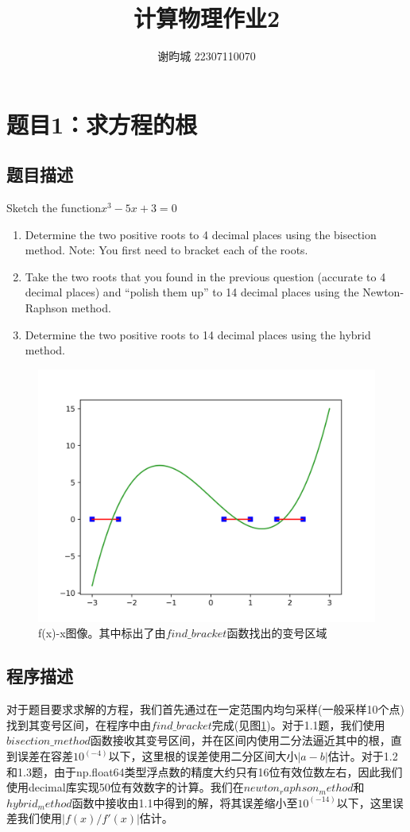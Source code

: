 \documentclass[11pt]{article}
\author{谢昀城 22307110070}
\title{计算物理作业2}
\begin{document}
\maketitle


\section{题目1：求方程的根}
\subsection{题目描述}
Sketch the function$x^3-5x+3=0$
\begin{enumerate}
    \item Determine the two positive roots to 4 decimal places using the bisection method. Note: You first need to bracket each of the roots.
    \item Take the two roots that you found in the previous question (accurate to 4 decimal places) and “polish them up” to 14 decimal places using the Newton-Raphson method.
    \item Determine the two positive roots to 14 decimal places using the hybrid method.
\end{enumerate}
\begin{figure}[!ht]
    \centering
    \includegraphics[width=0.6\linewidth]{photo/f(x) with bracket.png}
    \caption{f(x)-x图像。其中标出了由$find\_bracket$函数找出的变号区域}
    \label{fig:1}
\end{figure}

\subsection{程序描述}
对于题目要求求解的方程，我们首先通过在一定范围内均匀采样(一般采样10个点)找到其变号区间，在程序中由$find\_bracket$完成(见图\ref{fig:1})。对于1.1题，我们使用$bisection\_method$函数接收其变号区间，并在区间内使用二分法逼近其中的根，直到误差在容差$10^(-4)$以下，这里根的误差使用二分区间大小$|a-b|$估计。对于1.2和1.3题，由于np.float64类型浮点数的精度大约只有16位有效位数左右，因此我们使用decimal库实现50位有效数字的计算。我们在$newton_raphson_method$和$hybrid_method$函数中接收由1.1中得到的解，将其误差缩小至$10^(-14)$以下，这里误差我们使用$|f(x)/f'(x)|$估计。
\end{document}
